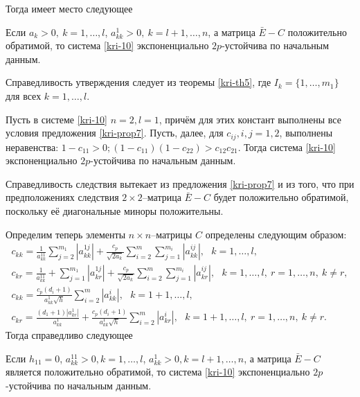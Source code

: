 Тогда имеет место следующее

\begin{proposition}\label{kri-prop7} Если $a_k
> 0, \ k = 1,\dots,l$, $a^1_{kk} > 0, \ k = l +1,\dots,n$, а
матрица $\bar E - C$ положительно обратимой, то система \eqref{kri-10}
экспоненциально $2p$-устойчива по начальным данным.
\end{proposition}

Справедливость утверждения следует из теоремы \ref{kri-th5}, где $I_k = \{1,
\dots, m_1\}$ для всех $k = 1, \dots, l$.

\begin{corollary}\label{kri-cor1}  Пусть в системе \eqref{kri-10} $n = 2, l = 1$,
причём для этих констант выполнены все условия предложения \ref{kri-prop7}. Пусть,
далее, для $c_{ij}, i,j = 1, 2$, выполнены неравенства: $ 1 - c_{11}
> 0; (1 - c_{11})(1 - c_{22}) > c_{12}c_{21}$. Тогда система \eqref{kri-10}
экспоненциально $2p$-устойчива по начальным данным.
\end{corollary}

Справедливость следствия вытекает из предложения \ref{kri-prop7} и из того, что при
предположениях следствия $2\times 2$--матрица $\bar E - C$ будет
положительно обратимой, поскольку её диагональные миноры
положительны.

Определим теперь элементы  $n\times n$--матрицы $C$ определены
следующим образом:
$$
\begin{array}{crl}
c_{kk}  = \frac{1}{a^{11}_{kk}}\sum \limits_{j =2}^{m_1}
|a^{1j}_{kk}| + \frac{c_p}{\sqrt{2a_k }}\sum
\limits_{i=2}^m \sum \limits_{j=1}^{m_i}|a^{ij}_{kk}|, \ \ \ k = 1,\dots,l,\\
c_{kr} = \frac{1}{a _{kk}^{11}} + \sum \limits_{j=1}^{m_1}
|a^{1j}_{kr}|+ \frac{c_p}{\sqrt{2a_k }}\sum \limits_{i=2}^m \sum
\limits_{j=1}^{m_i} |a^{ij}_{kr}|, \ \ \ k =
1,\dots,l, \ r = 1, \dots, n, \ k \neq r,\\
 c_{kk} = \frac{c_p(d_i+1)}{a^1_{kk}\sqrt{h}}
\sum\limits _{i=2}^{m}|a^{i}_{kk}|, \ \ \ k = 1 + 1,\dots,l, \\
c_{kr} = \frac{(d_1 + 1)|a^{1}_{kr}|}{a^1_{kk}}
+\frac{c_p(d_i+1)}{a^1_{kk}\sqrt{h}} \sum\limits
_{i=2}^{m}|a^{i}_{kr}|, \ \ \ k = 1 + 1,\dots,l, \ r = 1, \dots,n, \ k
\neq r.
\end{array}
$$
Тогда справедливо следующее

\begin{proposition}\label{kri-prop8}
 Если $h_{11} =0$, $ a^{11}_{kk}
> 0, k = 1,\dots,l$, $a^1_{kk} > 0, k = l + 1,\dots,n$, а матрица $\bar E - C$ является
положительно обратимой, то система \eqref{kri-10} экспоненциально
$2p$-устойчива по начальным данным.
\end{proposition}

